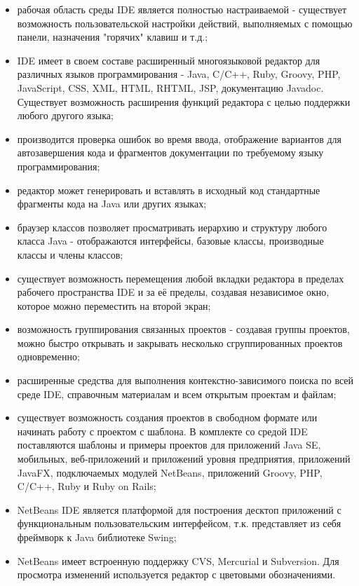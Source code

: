 \begin{itemize}
\item рабочая область среды IDE является полностью настраиваемой - существует возможность пользовательской настройки действий, выполняемых с помощью панели, назначения "горячих" клавиш и т.д.;
\item IDE имеет в своем составе расширенный многоязыковой редактор для различных языков программирования - Java, C/C++, Ruby, Groovy, PHP, JavaScript, CSS, XML, HTML, RHTML, JSP, документацию Javadoc. Существует возможность расширения функций редактора с целью поддержки любого другого языка;
\item производится проверка ошибок во время ввода, отображение вариантов для автозавершения кода и фрагментов документации по требуемому языку программирования;
\item редактор может генерировать и вставлять в исходный код стандартные фрагменты кода на Java или других языках;
\item браузер классов позволяет просматривать иерархию и структуру любого класса Java - отображаются интерфейсы, базовые классы, производные классы и члены классов;
\item существует возможность перемещения любой вкладки редактора в пределах рабочего пространства IDE и за её пределы, создавая независимое окно, которое можно переместить на второй экран;
\item возможность группирования связанных проектов - создавая группы проектов, можно быстро открывать и закрывать несколько сгруппированных проектов одновременно;
\item расширенные средства для выполнения контекстно-зависимого поиска по всей среде IDE, справочным материалам и всем открытым проектам и файлам;
\item существует возможность создания проектов в свободном формате или начинать работу с проектом с шаблона. В комплекте со средой IDE поставляются шаблоны и примеры проектов для приложений Java SE, мобильных, веб-приложений и приложений уровня предприятия, приложений JavaFX, подключаемых модулей NetBeans, приложений Groovy, PHP, C/C++, Ruby и Ruby on Rails;
\item NetBeans IDE является платформой для построения десктоп приложений с функциональным пользовательским интерфейсом, т.к. представляет из себя фреймворк к Java библиотеке Swing;
\item NetBeans имеет встроенную поддержку CVS, Mercurial и Subversion. Для просмотра изменений используется редактор с цветовыми обозначениями.
\end{itemize}

